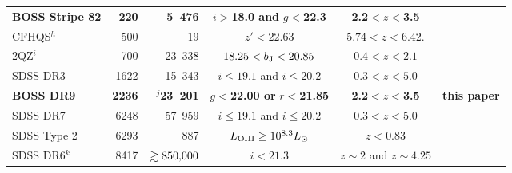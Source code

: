 \documentclass[11pt,a4paper]{article}
\begin{document}
\begin{landscape}
\begin{table*}
\begin{center}
\begin{tabular}{lrrccl}
      {\bf BOSS Stripe 82} & {\bf 220}  &{\bf \hbox{5 476}} & $i>${\bf 18.0 and} $g< ${\bf 22.3}  & {\bf 2.2}$<z<${\bf 3.5}  &\citet{Palanque-Delabrouille11} \\ 
      CFHQS$^{h}$             & 500      &  \hbox{ 19}                  & $z'<22.63$           &  $5.74 < z < 6.42. $ & \citet{Willott10} \\
      2QZ$^{i}$                 &   700     & \hbox{23 338} & $18.25<b_{\rm J}<20.85$   & $0.4<z<2.1$     & \citet{Boyle00, Croom04}     \\
      SDSS DR3                 & 1622     & \hbox{15 343} &  $i\leq 19.1$ and $i\leq 20.2$ &  $0.3<z<5.0$ & \citet{Richards06} \\
     {\bf BOSS DR9}  &  {\bf 2236}  & $^{j}${\bf \hbox{23 201}} & $g<${\bf 22.00 or }$r<${\bf 21.85}  & {\bf 2.2}$<z<${\bf 3.5}  & {\bf this paper}           \\
     SDSS DR7                 &  6248 & \hbox{57 959}  &  $i\leq 19.1$ and $i\leq 20.2$ &  $0.3<z<5.0$ & \citet{Shen_Kelly12} \\
      SDSS Type 2            &  6293 & \hbox{   887}  & $L_{\rm O III} \geq 10^{8.3} L_\odot$ &  $z<0.83$ & \citet{Reyes08} \\
      SDSS DR6$^{k}$        &  8417 & $\gtrsim\hbox{850,000}$ &  $i<21.3 $        &  $z\sim2$ and $z\sim4.25$ & \citet{Richards09}
  \\
      \hline
      \hline
   \end{tabular}
    \caption{Selected optical quasar luminosity function measurements.\\ 
      $^{a}$Cosmic Evolution Survey \citep{Scoville07}. \\
      $^{b}$No Type-1 quasars were identified, though a low-luminosity $z\sim5.07$ Type-2 quasar was discovered. \\
      $^{c}$NOAO Deep Wide-Field Survey \citep{JD99} and the Deep Lens Survey \citep{Wittman02}. \\
      $^{d}$SDSS Faint Quasar Survey. \\
      $^{e}$The ``boss21'' area on the SDSS Stripe 82 field. \\
      $^{f}$2dF-SDSS LRG And QSO Survey \citep{Croom09a}. \\
      $^{g}$Photometric sample from SDSS; spectroscopic confirmation from SDSS and other telescopes.\\
      $^{h}$Canada-France High-$z$ Quasar Survey \citep{Willott09}\\
      $^{i}$2dF Quasar Redshift Survey \citep{Croom04}. \\
      $^{j}$From our ``uniform'' sample defined in Section~\ref{sec:data_uniform} \\
      $^{k}$From a catalog of $>$1,000,000 photometrically classified quasar candidates. \\}
      \label{tab:previous_surveys}
  \end{center}
\end{table*}
\end{landscape}
\end{document}
